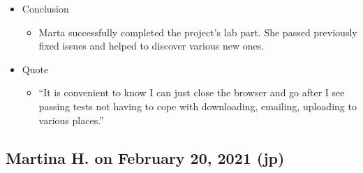 \begin{itemize}
\item
  {Conclusion}
  \begin{itemize}
  \item
    {Marta successfully completed the project's lab part. She passed previously fixed issues and helped to discover various new ones.}
  \end{itemize}

\item
  {Quote}
  \begin{itemize}
  \item
    {``It is convenient to know I can just close the browser and go after I see passing tests not having to cope with downloading, emailing, uploading to various places.''}
  \end{itemize}
\end{itemize}

\subsection{Martina H. on February 20, 2021 (jp)}\label{ssec:martina0220}

